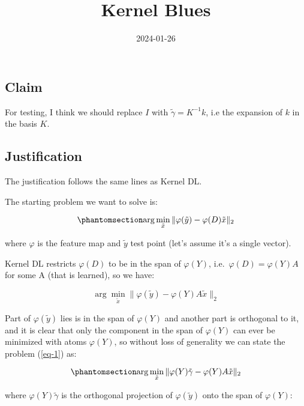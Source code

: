 \documentclass[
  letterpaper,
  DIV=11,
  numbers=noendperiod]{scrartcl}
\title{Kernel Blues}
\author{}
\date{2024-01-26}
\renewcommand*\contentsname{Table of contents}
\newcommand\contentsname{Table of contents}
\begin{document}
\maketitle

\renewcommand*\contentsname{Table of contents}
{
\hypersetup{linkcolor=}
\setcounter{tocdepth}{3}
\tableofcontents
}
\subsection{Claim}\label{claim}

For testing, I think we should replace \(I\) with
\(\tilde{\gamma} = K^{-1} k\), i.e the expansion of \(k\) in the basis
\(K\).

\subsection{Justification}\label{justification}

The justification follows the same lines as Kernel DL.

The starting problem we want to solve is:

\begin{equation}\phantomsection\label{eq-1}{\arg\min_{\tilde{x}} \|\varphi(\tilde{y}) - \varphi(D) \tilde{x}\|_2}\end{equation}

where \(\varphi\) is the feature map and \(\tilde{y}\) test point (let's
assume it's a single vector).

Kernel DL restricts \(\varphi(D)\) to be in the span of \(\varphi(Y)\),
i.e.~\(\varphi(D) = \varphi(Y) A\) for some A (that is learned), so we
have:

\[\arg\min_{\tilde{x}} \|\varphi(\tilde{y}) - \varphi(Y) A \tilde{x}\|_2\]

Part of \(\varphi(\tilde{y})\) lies is in the span of \(\varphi(Y)\) and
another part is orthogonal to it, and it is clear that only the
component in the span of \(\varphi(Y)\) can ever be minimized with atoms
\(\varphi(Y)\), so without loss of generality we can state the problem
(\ref{eq-1}) as:

\begin{equation}\phantomsection\label{eq-2}{\arg\min_{\tilde{x}} \|\varphi(Y) \tilde{\gamma} - \varphi(Y) A \tilde{x}\|_2}\end{equation}

where \(\varphi(Y)\tilde{\gamma}\) is the orthogonal projection of
\(\varphi(\tilde{y})\) onto the span of \(\varphi(Y)\):
\end{document}
